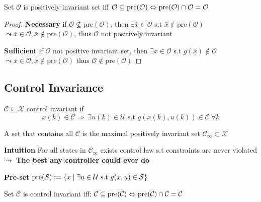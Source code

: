 \begin{theorem}
	Set $\mathcal{O}$ is positively invariant set iff
	$\mathcal{O}\subseteq\operatorname{pre}(\mathcal{O})
		\Leftrightarrow
		\operatorname{pre}(\mathcal{O})\cap\mathcal{O} = \mathcal{O}$
\end{theorem}
\begin{proof}
	\textbf{Necessary} if
	$\mathcal{O} \nsubseteq  \mathrm{pre}(\mathcal{O})$,
	then $\exists\bar{x} \in \mathcal{O}$
	s.t $\bar{x} \notin \mathrm{pre}(\mathcal{O})$
	$\leadsto \bar{x}\in\mathcal{O},
		\bar{x}\notin\mathrm{pre}(\mathcal{O})$,
	thus $\mathcal{O}$ not positively invariant

	\textbf{Sufficient} if
	$\mathcal{O}$ not positive invariant set,
	then $\exists \bar{x}\in\mathcal{O}$
	s.t $g(\bar{x}) \notin\mathcal{O}$
	$\leadsto \bar{x}\in\mathcal{O},
		\bar{x}\notin\mathrm{pre}(\mathcal{O})$
	thus $\mathcal{O}\notin \mathrm{pre}(\mathcal{O})$
\end{proof}



\subsection{Control Invariance}


\begin{definition}
	$\mathcal{C} \subseteq \mathcal{X}$ control invariant if
	$$x(k) \in \mathcal{C} \Rightarrow
		\ \exists u(k) \in \mathcal{U} \text{ s.t }
		g(x(k),u(k))\in\mathcal{C} \ \forall k$$
\end{definition}

\begin{definition}
	A set that contains all $\mathcal{C}$
	is the maximal positively invariant set
	$\mathcal{C}_\infty \subset \mathcal{X}$

	\textbf{Intuition} For all states in $\mathcal{C}_\infty$
	exists control law s.t constraints are never violated
	$\leadsto$ \textbf{The best any controller could ever do}
\end{definition}

\textbf{Pre-set}
$\operatorname{pre}(\mathcal{S}):=\{x \mid \exists u\in\mathcal{U}
	\text{ s.t } g(x,u) \in \mathcal{S}\}$

Set $\mathcal{C}$ is control invariant iff:
$\mathcal{C}\subseteq\operatorname{pre}(\mathcal{C})
	\Leftrightarrow
	\operatorname{pre}(\mathcal{C})\cap\mathcal{C} = \mathcal{C}$

